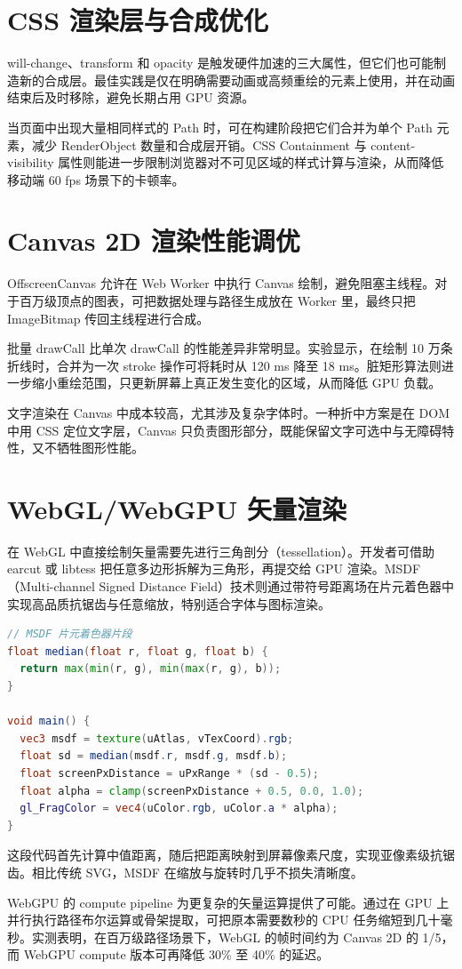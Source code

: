 \section{CSS 渲染层与合成优化}
will-change、transform 和 opacity 是触发硬件加速的三大属性，但它们也可能制造新的合成层。最佳实践是仅在明确需要动画或高频重绘的元素上使用，并在动画结束后及时移除，避免长期占用 GPU 资源。\par
当页面中出现大量相同样式的 Path 时，可在构建阶段把它们合并为单个 Path 元素，减少 RenderObject 数量和合成层开销。CSS Containment 与 content-visibility 属性则能进一步限制浏览器对不可见区域的样式计算与渲染，从而降低移动端 60 fps 场景下的卡顿率。\par
\section{Canvas 2D 渲染性能调优}
OffscreenCanvas 允许在 Web Worker 中执行 Canvas 绘制，避免阻塞主线程。对于百万级顶点的图表，可把数据处理与路径生成放在 Worker 里，最终只把 ImageBitmap 传回主线程进行合成。\par
批量 drawCall 比单次 drawCall 的性能差异非常明显。实验显示，在绘制 10 万条折线时，合并为一次 stroke 操作可将耗时从 120 ms 降至 18 ms。脏矩形算法则进一步缩小重绘范围，只更新屏幕上真正发生变化的区域，从而降低 GPU 负载。\par
文字渲染在 Canvas 中成本较高，尤其涉及复杂字体时。一种折中方案是在 DOM 中用 CSS 定位文字层，Canvas 只负责图形部分，既能保留文字可选中与无障碍特性，又不牺牲图形性能。\par
\section{WebGL/WebGPU 矢量渲染}
在 WebGL 中直接绘制矢量需要先进行三角剖分（tessellation）。开发者可借助 earcut 或 libtess 把任意多边形拆解为三角形，再提交给 GPU 渲染。MSDF（Multi-channel Signed Distance Field）技术则通过带符号距离场在片元着色器中实现高品质抗锯齿与任意缩放，特别适合字体与图标渲染。\par
\begin{lstlisting}[language=glsl]
// MSDF 片元着色器片段
float median(float r, float g, float b) {
  return max(min(r, g), min(max(r, g), b));
}

void main() {
  vec3 msdf = texture(uAtlas, vTexCoord).rgb;
  float sd = median(msdf.r, msdf.g, msdf.b);
  float screenPxDistance = uPxRange * (sd - 0.5);
  float alpha = clamp(screenPxDistance + 0.5, 0.0, 1.0);
  gl_FragColor = vec4(uColor.rgb, uColor.a * alpha);
}
\end{lstlisting}
这段代码首先计算中值距离，随后把距离映射到屏幕像素尺度，实现亚像素级抗锯齿。相比传统 SVG，MSDF 在缩放与旋转时几乎不损失清晰度。\par
WebGPU 的 compute pipeline 为更复杂的矢量运算提供了可能。通过在 GPU 上并行执行路径布尔运算或骨架提取，可把原本需要数秒的 CPU 任务缩短到几十毫秒。实测表明，在百万级路径场景下，WebGL 的帧时间约为 Canvas 2D 的 1/5，而 WebGPU compute 版本可再降低 30\%{} 至 40\%{} 的延迟。\par
